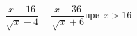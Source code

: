 \begin{ex}[type=calculate_expression]
	\begin{condition}
		\( \dfrac{x-16}{\sqrt{x}-4}-\dfrac{x-36}{\sqrt{x}+6} \)\quad при \( x>16 \)
	\end{condition}
\end{ex}